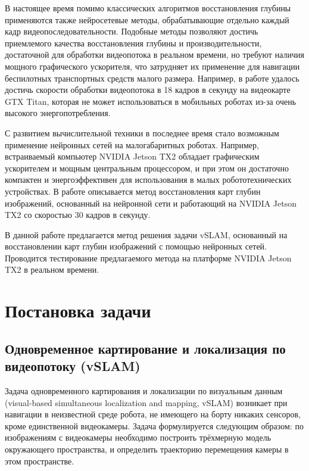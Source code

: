 \documentclass{mipt-thesis-bs}
\begin{document}
В настоящее время помимо классических алгоритмов восстановления глубины применяются также нейросетевые методы, обрабатывающие отдельно каждый кадр видеопоследовательности. Подобные методы позволяют достичь приемлемого качества восстановления глубины  и производительности, достаточной для обработки видеопотока в реальном времени, но требуют наличия мощного графического ускорителя, что затрудняет их применение для навигации беспилотных транспортных средств малого размера. Например, в работе \cite{laina2016deeper} удалось достичь скорости обработки видеопотока в 18 кадров в секунду на видеокарте GTX Titan, которая не может использоваться в мобильных роботах из-за очень высокого энергопотребления.

С развитием вычислительной техники в последнее время стало возможным применение нейронных сетей на малогабаритных роботах. Например, встраиваемый компьютер NVIDIA Jetson TX2 \cite{franklin2017nvidia} обладает графическим ускорителем и мощным центральным процессором, и при этом он достаточно компактен и энергоэффективен для использования в малых робототехнических устройствах. В работе \cite{spek2018cream} описывается метод восстановления карт глубин изображений, основанный на нейронной сети и работающий на NVIDIA Jetson TX2 со скоростью 30 кадров в секунду.

В данной работе предлагается метод решения задачи vSLAM, основанный на восстановлении карт глубин изображений с помощью нейронных сетей. Проводится тестирование предлагаемого метода на платформе NVIDIA Jetson TX2 в реальном времени.



\chapter{Постановка задачи}

\section{Одновременное картирование и локализация по видеопотоку (vSLAM)}

Задача одновременного картирования и локализации по визуальным данным (visual-based simultaneous localization and mapping, vSLAM) возникает при навигации в неизвестной среде робота, не имеющего на борту никаких сенсоров, кроме единственной видеокамеры. Задача формулируется следующим образом: по изображениям с видеокамеры необходимо построить трёхмерную модель окружающего пространства, и определить траекторию перемещения камеры в этом пространстве.
\end{document}

